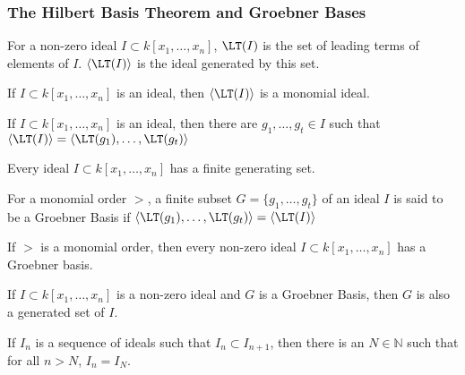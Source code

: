 \documentclass[crop=false,class=article,oneside]{standalone}
\begin{document}
        \subsubsection{The Hilbert Basis Theorem and Groebner Bases}
            \begin{definition}
                For a non-zero ideal $I\subset k[x_1,\hdots ,x_n]$,
                $\LT(I)$ is the set of leading terms of elements
                of $I$. $\langle \LT(I)\rangle$ is the ideal
                generated by this set.
            \end{definition}
            \begin{theorem}
                If $I\subset k[x_1,\hdots ,x_n]$ is an ideal,
                then $\langle \LT(I)\rangle$ is a monomial ideal.
            \end{theorem}
            \begin{theorem}
                If $I\subset k[x_1,\hdots ,x_n]$ is an ideal,
                then there are $g_1,\hdots, g_t\in I$ such that
                $\langle\LT(I)\rangle%
                 =\langle\LT(g_1),\hdots,\LT(g_t)\rangle$
            \end{theorem}
            \begin{theorem}
                Every ideal $I\subset k[x_1,\hdots,x_n]$
                has a finite generating set.
            \end{theorem}
            \begin{definition}
                For a monomial order $>$, a finite subset
                $G=\{g_1,\hdots, g_t\}$ of an ideal $I$ is
                said to be a Groebner Basis if
                $\langle\LT(g_1),\hdots,\LT(g_t)\rangle%
                 =\langle \LT(I)\rangle$
            \end{definition}
            \begin{theorem}
                If $>$ is a monomial order, then every non-zero
                ideal $I\subset k[x_1,\hdots,x_n]$ has a Groebner basis.
            \end{theorem}
            \begin{theorem}
                If $I\subset k[x_1,\hdots ,x_n]$ is a non-zero
                ideal and $G$ is a Groebner Basis, then $G$
                is also a generated set of $I$.
            \end{theorem}
            \begin{theorem}
                If $I_n$ is a sequence of ideals such that
                $I_{n}\subset I_{n+1}$, then there is an
                $N\in\mathbb{N}$ such that for all $n>N$,
                $I_n=I_N$.
            \end{theorem}
\end{document}
